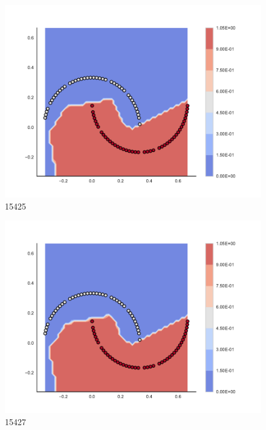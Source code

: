 \begin{subfigure}[b]{0.09\textwidth}
    \includegraphics[clip, trim=2.35cm 1.75cm 4.5cm 0cm,width=\textwidth]{img/convergence/15425.pdf}
    \caption{15425}
    \label{fig:convergence_15425}
\end{subfigure}
%
\begin{subfigure}[b]{0.09\textwidth}
    \includegraphics[clip, trim=2.35cm 1.75cm 4.5cm 0cm,width=\textwidth]{img/convergence/15427.pdf}
    \caption{15427}
    \label{fig:convergence_15427}
\end{subfigure}
%
